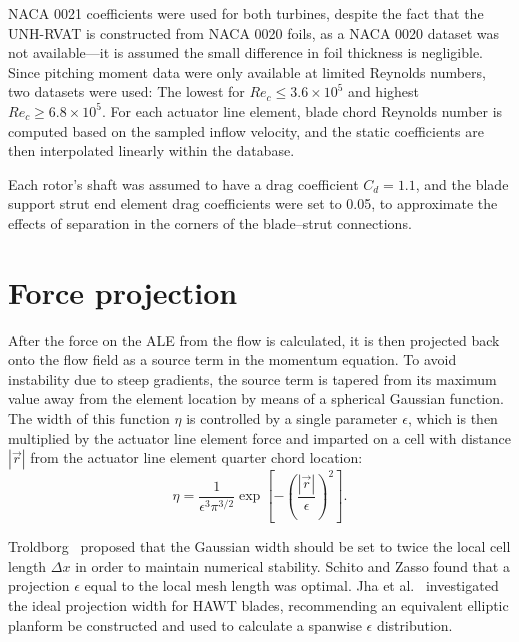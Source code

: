 \documentclass[times]{weauth}
\begin{document}

NACA 0021 coefficients were used for both turbines, despite the fact that the
UNH-RVAT is constructed from NACA 0020 foils, as a NACA 0020 dataset was not
available---it is assumed the small difference in foil thickness is negligible.
Since pitching moment data were only available at limited Reynolds numbers, two
datasets were used: The lowest for $Re_c \leq 3.6 \times 10^5$ and highest $Re_c
\geq 6.8 \times 10^5$. For each actuator line element, blade chord Reynolds
number is computed based on the sampled inflow velocity, and the static
coefficients are then interpolated linearly within the database.

Each rotor's shaft was assumed to have a drag coefficient $C_d = 1.1$, and the
blade support strut end element drag coefficients were set to 0.05, to
approximate the effects of separation in the corners of the blade--strut
connections.


\section{Force projection}

After the force on the ALE from the flow is calculated, it is then projected
back onto the flow field as a source term in the momentum equation. To avoid
instability due to steep gradients, the source term is tapered from its maximum
value away from the element location by means of a spherical Gaussian function.
The width of this function $\eta$ is controlled by a single parameter
$\epsilon$, which is then multiplied by the actuator line element force and
imparted on a cell with distance $| \vec{r} |$ from the actuator line element
quarter chord location:
\begin{equation}
    \eta = \frac{1}{\epsilon^3 \pi^{3/2}} \exp
    \left[ - \left( \frac{| \vec{r} |}{\epsilon} \right)^2 \right].
    \label{eq:projection}
\end{equation}

Troldborg~\cite{Troldborg2008} proposed that the Gaussian width should be set to
twice the local cell length $\Delta x$ in order to maintain numerical stability.
Schito and Zasso \cite{Schito2014} found that a projection $\epsilon$ equal to
the local mesh length was optimal. Jha et al.~\cite{Jha2014} investigated the
ideal projection width for HAWT blades, recommending an equivalent elliptic
planform be constructed and used to calculate a spanwise $\epsilon$
distribution.
\end{document}
